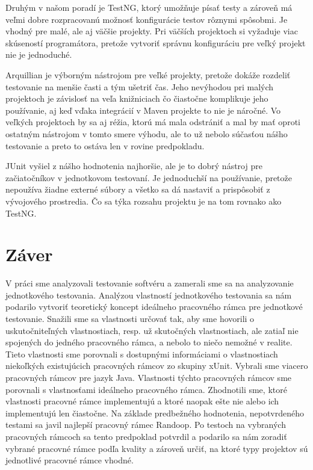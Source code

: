 \documentclass[11pt,twoside,slovak,a4paper]{article}
\begin{document}
	Druhým v našom poradí je TestNG, ktorý umožňuje písať testy a zároveň má veľmi dobre rozpracovanú možnosť konfigurácie testov rôznymi spôsobmi. Je vhodný pre malé, ale aj väčšie projekty. Pri väčších projektoch si vyžaduje viac skúseností programátora, pretože vytvoriť správnu konfiguráciu pre veľký projekt nie je jednoduché.
	
	Arquillian je výborným nástrojom pre veľké projekty, pretože dokáže rozdeliť testovanie na menšie časti a tým ušetriť čas. Jeho nevýhodou pri malých projektoch je závislosť na veľa knižniciach čo čiastočne komplikuje jeho používanie, aj keď vďaka integrácií v Maven projekte to nie je náročné. Vo veľkých projektoch by sa aj réžia, ktorú má mala odstrániť a mal by mať oproti ostatným nástrojom v tomto smere výhodu, ale to už nebolo súčasťou nášho testovanie a preto to ostáva len v rovine predpokladu.
	
	JUnit vyšiel z nášho hodnotenia najhoršie, ale je to dobrý nástroj pre začiatočníkov v jednotkovom testovaní. Je jednoduchší na používanie, pretože nepoužíva žiadne externé súbory a všetko sa dá nastaviť a prispôsobiť z vývojového prostredia. Čo sa týka rozsahu projektu je na tom rovnako ako TestNG.
	
	\newpage
	\section{Záver}
	V práci sme analyzovali testovanie softvéru a zamerali sme sa na analyzovanie jednotkového testovania. Analýzou vlastností jednotkového testovania sa nám podarilo vytvoriť teoretický koncept ideálneho pracovného rámca pre jednotkové testovanie. Snažili sme sa vlastnosti určovať tak, aby sme hovorili o uskutočniteľných vlastnostiach, resp. už skutočných vlastnostiach, ale zatiaľ nie spojených do jedného pracovného rámca, a nebolo to niečo nemožné v realite. Tieto vlastnosti sme porovnali s dostupnými informáciami o vlastnostiach niekoľkých existujúcich pracovných rámcov zo skupiny xUnit. Vybrali sme viacero pracovných rámcov pre jazyk Java. Vlastnosti týchto pracovných rámcov sme porovnali s vlastnosťami ideálneho pracovného rámca. Zhodnotili sme, ktoré vlastnosti pracovné rámce implementujú a ktoré naopak ešte nie alebo ich implementujú len čiastočne. Na základe predbežného hodnotenia, nepotvrdeného testami sa javil najlepší pracovný rámec Randoop. Po testoch na vybraných pracovných rámcoch sa tento predpoklad potvrdil a podarilo sa nám zoradiť vybrané pracovné rámce podľa kvality a zároveň určiť, na ktoré typy projektov sú jednotlivé pracovné rámce vhodné.
\end{document}
